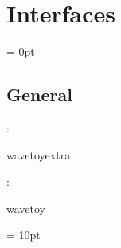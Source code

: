 
\section{Interfaces} 


\parskip = 0pt

\vspace{3mm} \subsection*{General}

: 

wavetoyextra
\vspace{2mm}

: 

wavetoy
\vspace{2mm}

\vspace{5mm}\parskip = 10pt 
